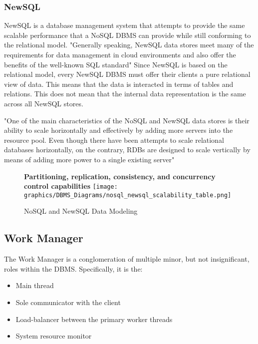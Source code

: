 \documentclass[letterpaper, 12pt]{article}
\renewcommand{\includegraphics}[2][]{\fbox{}}
\begin{document}
\subsubsection{NewSQL}
NewSQL is a database management system that attempts to provide
the same scalable performance that a NoSQL DBMS can provide while still conforming to 
the relational model. "Generally speaking, NewSQL data stores meet many of the 
requirements for data management in cloud environments and also offer the benefits of 
the well-known SQL standard"\cite{grolinger2013data}
Since NewSQL is based on the relational model, every NewSQL DBMS must offer their clients
a pure relational view of data. This means that the data is interacted in terms of tables
and relations. This does not mean that the internal data representation is the same across
all NewSQL stores. 
\par\vspace{\baselineskip}
"One of the main characteristics of the NoSQL and NewSQL data stores is their ability to 
scale horizontally and effectively by adding more servers into the resource pool. Even 
though there have been attempts to scale relational databases horizontally, on the contrary, 
RDBs are designed to scale vertically by means of adding more power to a single existing 
server"\cite{grolinger2013data}

\begin{figure}
  \textbf{Partitioning, replication, consistency, and concurrency control capabilities}
  \texttt{[image: graphics/DBMS\_Diagrams/nosql\_newsql\_scalability\_table.png]}
  \caption{NoSQL and NewSQL Data Modeling}
\end{figure}

\newpage

\subsection{Work Manager}
The Work Manager is a conglomeration of multiple minor, but not insignificant, roles
within the DBMS. Specifically, it is the:
\begin{itemize}
  \item Main thread
  \item Sole communicator with the client
  \item Load-balancer between the primary worker threads
  \item System resource monitor
\end{itemize}
\end{document}

